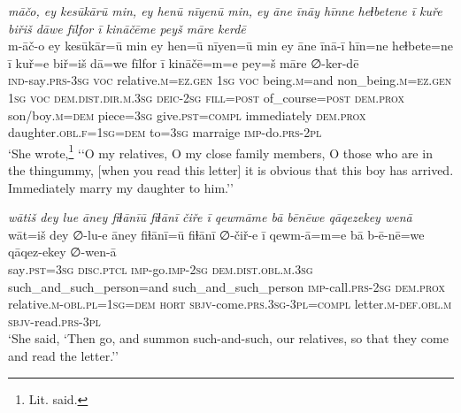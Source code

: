 \ea \label{KŠ.80}
\textit{māčo, ey kesūkārū min, ey henū nīyenū min, ey āne īnāy hīnne heɫbetene ī kuře biřiš dāwe fīlfor ī kināčēme peyš māre kerdē} \\ 
\gll m-āč-o ey kesūkār=ū min ey hen=ū nīyen=ū min ey āne īnā-ī hīn=ne heɫbete=ne ī kuř=e biř=iš dā=we fīlfor ī kināčē=m=e pey=š māre ∅-ker-dē \\ 
 \textsc{ind-}say\textsc{.prs}\textsc{-3sg} \textsc{voc} relative\textsc{.m}\textsc{\textsc{=ez.gen}} \textsc{1sg} \textsc{voc} being\textsc{.m}=and non\_being\textsc{.m}\textsc{\textsc{=ez.gen}} \textsc{1sg} \textsc{voc} \textsc{dem.dist}\textsc{.dir}\textsc{.m}\textsc{.3sg} \textsc{deic}-\textsc{2sg} \textsc{fill}\textsc{=\textsc{post}} of\_course\textsc{=\textsc{post}} \textsc{dem.prox} son/boy\textsc{.m}\textsc{=dem} piece\textsc{=3sg} give\textsc{.pst}\textsc{=compl} immediately \textsc{dem.prox} daughter\textsc{.obl}\textsc{.f}\textsc{=\textsc{1sg}}\textsc{=dem} to\textsc{=3sg} marraige \textsc{imp-}do\textsc{.prs}-\textsc{2pl} \\ 
\glt `She wrote,\footnote{Lit. said.} ‘‘O my relatives, O my close family members, O those who are in the thingummy, [when you read this letter] it is obvious that this boy has arrived. Immediately marry my daughter to him.’'
\z 
 
\ea \label{KŠ.86}
\textit{wātiš dey lue āney fiɫānīū fiɫānī čiře ī qewmāme bā bēnēwe qāqezekey wenā} \\ 
\gll wāt=iš dey ∅-lu-e āney fiɫānī=ū fiɫānī ∅-čiř-e ī qewm-ā=m=e bā b-ē-nē=we qāqez-ekey ∅-wen-ā \\ 
 say\textsc{.pst}\textsc{=3sg} \textsc{disc.ptcl} \textsc{imp-}go.\textsc{imp-}\textsc{2sg} \textsc{dem.dist}\textsc{.obl}\textsc{.m}\textsc{.3sg} such\_and\_such\_person=and such\_and\_such\_person \textsc{imp-}call\textsc{.prs}-\textsc{2sg} \textsc{dem.prox} relative\textsc{.m}\textsc{-obl}\textsc{.pl}\textsc{=\textsc{1sg}}\textsc{=dem} \textsc{hort} \textsc{sbjv-}come\textsc{.prs}\textsc{.3sg}\textsc{-3pl}\textsc{=compl} letter\textsc{.m}\textsc{-def}\textsc{.obl}\textsc{.m} \textsc{sbjv-}read\textsc{.prs}\textsc{-3pl} \\ 
\glt `She said, ‘Then go, and summon such-and-such, our relatives, so that they come and read the letter.’'
\z 
 
